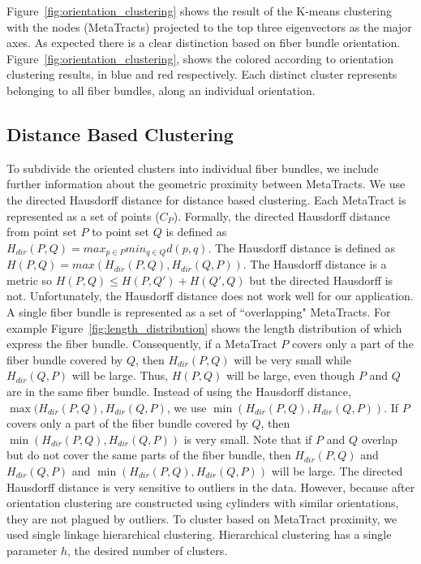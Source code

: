Figure~\ref{fig:orientation_clustering} shows the result of the K-means clustering with the nodes (MetaTracts) projected to the top three eigenvectors as the major axes. As expected there is a clear distinction based on fiber bundle orientation. Figure~\ref{fig:orientation_clustering}, shows the \mt colored according to orientation clustering results, in blue and red respectively.
Each distinct cluster represents \mt belonging to all fiber bundles, along an individual orientation. 
\subsection{Distance Based Clustering}
\label{subsec:dist_clustering}
To subdivide the oriented clusters into individual fiber bundles, we include further information about the geometric proximity between MetaTracts. We use the directed Hausdorff distance for distance based clustering.
Each MetaTract is represented as a set of points ($C_P$). Formally, the directed Hausdorff distance from point set $P$ to point set $Q$ is defined as 
$H_{dir}(P,Q) = max_{p \in P} min_{q \in Q} d(p,q)$.
The Hausdorff distance is defined as $H(P,Q) = max(H_{dir}(P,Q),H_{dir}(Q,P))$.
The Hausdorff distance is a metric so $H(P,Q) \le H(P,Q') + H(Q',Q)$ but the directed Hausdorff is not.
%
Unfortunately, the Hausdorff distance does not work well for our application. A single fiber bundle is represented as a set of ``overlapping" MetaTracts. For example  Figure~\ref{fig:length_distribution} shows the length distribution of \mt which express the fiber bundle. Consequently, if a MetaTract $P$ covers only a part of the fiber bundle covered by $Q$, then $H_{dir}(P,Q)$ will be very small while $H_{dir}(Q,P)$ will be large.
%
Thus, $H(P,Q)$ will be large, even though $P$ and $Q$ are in the same fiber bundle.
Instead of using the Hausdorff distance, $\max(H_{dir}(P,Q),H_{dir}(Q,P)$, we use $\min(H_{dir}(P,Q),H_{dir}(Q,P))$. If $P$ covers only a part of the fiber bundle covered by $Q$, then $\min(H_{dir}(P,Q),H_{dir}(Q,P))$ is very small.
Note that if $P$ and $Q$ overlap but do not cover the same parts of the fiber bundle, then $H_{dir}(P,Q)$ and $H_{dir}(Q,P)$ and $\min(H_{dir}(P,Q),H_{dir}(Q,P))$ will be large.
% 
The directed Hausdorff distance is very sensitive to outliers in the data.
However, because \mt after orientation clustering are constructed using cylinders with similar orientations, they are not plagued by outliers.
To cluster based on MetaTract proximity, we used single linkage hierarchical clustering.
Hierarchical clustering has a single parameter $h$, the desired number of clusters.
